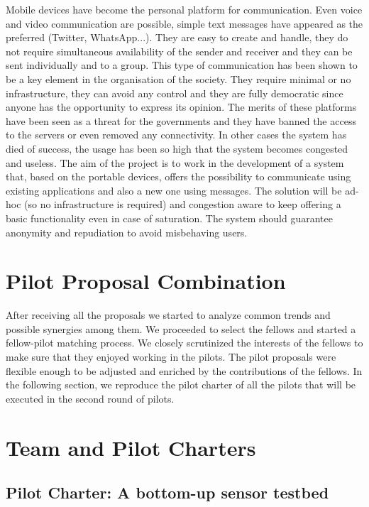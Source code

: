 \documentclass[draftclsnofoot,12pt,journal,onecolumn]{IEEEtran}
\begin{document}
Mobile devices have become the personal platform for communication. Even
voice and video communication are possible, simple text messages have
appeared as the preferred (Twitter, WhatsApp...). They are easy to create and
handle, they do not require simultaneous availability of the sender and
receiver and they can be sent individually and to a group.
This type of communication has been shown to be a key element in the
organisation of the society. They require minimal or no infrastructure, they
can avoid any control and they are fully democratic since anyone has the
opportunity to express its opinion.  The merits of these platforms have been
seen as a threat for the governments and they have banned the access to the
servers or even removed any connectivity. In other cases the system has died
of success, the usage has been so high that the system becomes congested and
useless.
The aim of the project is to work in the development of a system that, based
on the portable devices, offers the possibility to communicate using existing
applications and also a new one using messages. The solution will be ad-hoc
(so no infrastructure is required) and congestion aware to keep offering a
basic functionality even in case of saturation. The system should guarantee
anonymity and repudiation to avoid misbehaving users.

\section{Pilot Proposal Combination}
\label{sec:merging}

After receiving all the proposals we started to analyze common trends and possible synergies among them.
We proceeded to select the fellows and started a fellow-pilot matching process.
We closely scrutinized the interests of the fellows to make sure that they enjoyed working in the pilots.
The pilot proposals were flexible enough to be adjusted and enriched by the contributions of the fellows.
In the following section, we reproduce the pilot charter of all the pilots that will be executed in the second round of pilots.

\section{Team and Pilot Charters}
\label{sec:charters}

\subsection{Pilot Charter: A bottom-up sensor testbed}
\label{sec:mnp}
\end{document}
